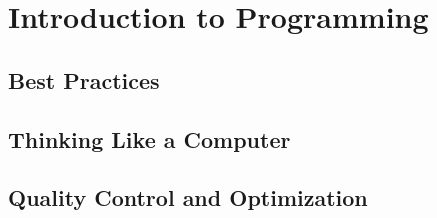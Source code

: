 \part{Introduction to Programming}

\chapter{Best Practices}




\chapter{Thinking Like a Computer}




\chapter{Quality Control and Optimization}


